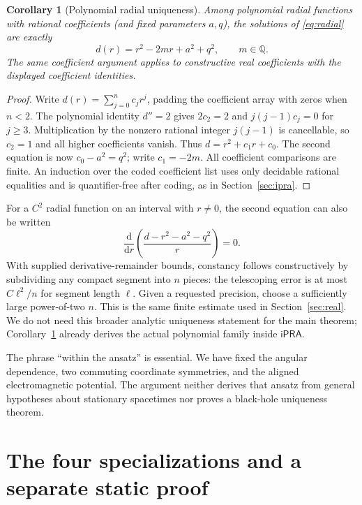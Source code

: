 \documentclass[11pt,a4paper]{article}
\numberwithin{equation}{section}
\newtheorem{corollary}[theorem]{Corollary}
\theoremstyle{definition}\newtheorem{definition}[theorem]{Definition}
\theoremstyle{remark}\newtheorem{remark}[theorem]{Remark}
\newcommand{\ipra}{\mathsf{iPRA}}
\newcommand{\dd}{\mathrm{d}}
\newcommand{\Q}{\mathbb{Q}}\newcommand{\Z}{\mathbb{Z}}\newcommand{\N}{\mathbb{N}}
\begin{document}
\begin{corollary}[Polynomial radial uniqueness]\label{cor:unique}
Among polynomial radial functions with rational coefficients (and fixed parameters $a,q$), the solutions of \eqref{eq:radial} are exactly
\[
 d(r)=r^2-2mr+a^2+q^2,\qquad m\in\Q.
\]
The same coefficient argument applies to constructive real coefficients with the displayed coefficient identities.
\end{corollary}
\begin{proof}
Write $d(r)=\sum_{j=0}^n c_jr^j$, padding the coefficient array with zeros when $n<2$. The polynomial identity $d''=2$ gives $2c_2=2$ and $j(j-1)c_j=0$ for $j\ge3$. Multiplication by the nonzero rational integer $j(j-1)$ is cancellable, so $c_2=1$ and all higher coefficients vanish. Thus $d=r^2+c_1r+c_0$. The second equation is now $c_0-a^2=q^2$; write $c_1=-2m$. All coefficient comparisons are finite. An induction over the coded coefficient list uses only decidable rational equalities and is quantifier-free after coding, as in Section~\ref{sec:ipra}.
\end{proof}

For a $C^2$ radial function on an interval with $r\ne0$, the second equation can also be written
\[
 \frac{\dd}{\dd r}\left(\frac{d-r^2-a^2-q^2}{r}\right)=0.
\]
With supplied derivative-remainder bounds, constancy follows constructively by subdividing any compact segment into $n$ pieces: the telescoping error is at most $C\ell^2/n$ for segment length $\ell$. Given a requested precision, choose a sufficiently large power-of-two $n$. This is the same finite estimate used in Section~\ref{sec:real}. We do not need this broader analytic uniqueness statement for the main theorem; Corollary~\ref{cor:unique} already derives the actual polynomial family inside $\ipra$.

The phrase ``within the ansatz'' is essential. We have fixed the angular dependence, two commuting coordinate symmetries, and the aligned electromagnetic potential. The argument neither derives that ansatz from general hypotheses about stationary spacetimes nor proves a black-hole uniqueness theorem.

\section{The four specializations and a separate static proof}\label{sec:four}
\end{document}
